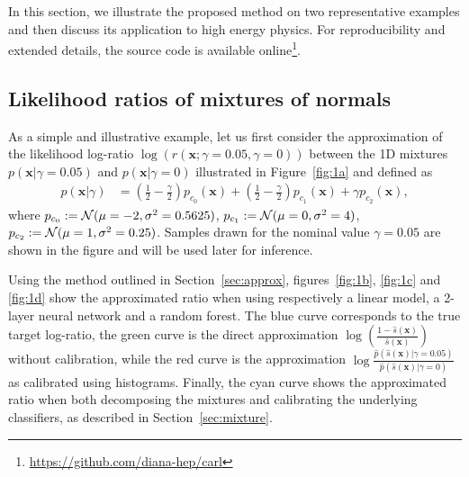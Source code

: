 \documentclass[12pt]{article}
\numberwithin{equation}{section}
\theoremstyle{plain}
\begin{document}
In this section, we illustrate the proposed method on two representative
examples and then discuss its application to high energy physics. For reproducibility and extended details, the source
code is available online\footnote{\url{https://github.com/diana-hep/carl}}.

\subsection{Likelihood ratios of mixtures of normals}

As a simple and illustrative example, let us first consider the approximation of
the likelihood log-ratio $\log \left( r(\mathbf{x};\gamma=0.05,\gamma=0) \right)$ between the 1D mixtures
$p(\mathbf{x}|\gamma=0.05)$ and $p(\mathbf{x}|\gamma=0)$ illustrated in
Figure~\ref{fig:1a} and defined as
\begin{align}
p(\mathbf{x}|\gamma) &= (\frac{1}{2} - \frac{\gamma}{2}) p_{c_0}(\mathbf{x}) + (\frac{1}{2} - \frac{\gamma}{2}) p_{c_1}(\mathbf{x}) + \gamma p_{c_2}(\mathbf{x}),
\end{align}
where $p_{c_0} := {\cal N}(\mu=-2, \sigma^2=0.5625)$, $p_{c_1} := {\cal N}(\mu=0, \sigma^2=4)$,
$p_{c_2} := {\cal N}(\mu=1, \sigma^2=0.25)$. Samples drawn for the nominal value $\gamma=0.05$ are shown in the
figure and will be used later for inference.

Using the method outlined in Section~\ref{sec:approx},
figures~\ref{fig:1b}, \ref{fig:1c} and \ref{fig:1d} show the approximated
ratio when using respectively a linear model, a 2-layer neural network and a random
forest. The blue curve corresponds to the true target log-ratio, the green curve is
the direct approximation $\log \left( \frac{1 - \hat s(\mathbf{x})}{\hat s(\mathbf{x})} \right)$
without calibration, while the red curve is the approximation $\log \frac{\hat p(\hat
s(\mathbf{x}) | \gamma=0.05)}{\hat p(\hat s(\mathbf{x}) | \gamma=0)}$ as calibrated
using histograms. Finally, the
cyan curve shows the approximated ratio when both decomposing the mixtures and calibrating the underlying classifiers, as
described in Section~\ref{sec:mixture}.
\end{document}
